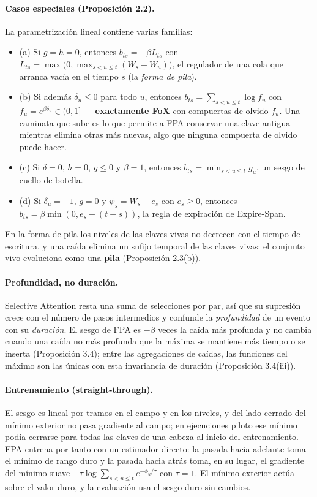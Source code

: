 \paragraph{Casos especiales (Proposición 2.2).} La parametrización lineal contiene varias familias:
\begin{itemize}[leftmargin=*]
    \item (a) Si $g=h=0$, entonces $b_{ts}=-\beta L_{ts}$ con $L_{ts}=\max\bigl(0,\max_{s<u\le t}(W_s-W_u)\bigr)$, el regulador de una cola que arranca vacía en el tiempo $s$ (la \emph{forma de pila}).
    \item (b) Si además $\delta_u\le 0$ para todo $u$, entonces $b_{ts}=\sum_{s<u\le t}\log f_u$ con $f_u=e^{\beta\delta_u}\in(0,1]$ --- \textbf{exactamente FoX} con compuertas de olvido $f_u$. Una caminata que sube es lo que permite a FPA conservar una clave antigua mientras elimina otras más nuevas, algo que ninguna compuerta de olvido puede hacer.
    \item (c) Si $\delta=0$, $h=0$, $g\le 0$ y $\beta=1$, entonces $b_{ts}=\min_{s<u\le t}g_u$, un sesgo de cuello de botella.
    \item (d) Si $\delta_u=-1$, $g=0$ y $\psi_s=W_s-e_s$ con $e_s\ge 0$, entonces $b_{ts}=\beta\min(0,e_s-(t-s))$, la regla de expiración de Expire-Span.
\end{itemize}
En la forma de pila los niveles de las claves vivas no decrecen con el tiempo de escritura, y una caída elimina un sufijo temporal de las claves vivas: el conjunto vivo evoluciona como una \textbf{pila} (Proposición 2.3(b)).

\paragraph{Profundidad, no duración.} Selective Attention resta una suma de selecciones por par, así que su supresión crece con el número de pasos intermedios y confunde la \emph{profundidad} de un evento con su \emph{duración}. El sesgo de FPA es $-\beta$ veces la caída más profunda y no cambia cuando una caída no más profunda que la máxima se mantiene más tiempo o se inserta (Proposición 3.4); entre las agregaciones de caídas, las funciones del máximo son las únicas con esta invariancia de duración (Proposición 3.4(iii)).

\paragraph{Entrenamiento (straight-through).} El sesgo es lineal por tramos en el campo y en los niveles, y del lado cerrado del mínimo exterior no pasa gradiente al campo; en ejecuciones piloto ese mínimo podía cerrarse para todas las claves de una cabeza al inicio del entrenamiento. FPA entrena por tanto con un estimador directo: la pasada hacia adelante toma el mínimo de rango duro y la pasada hacia atrás toma, en su lugar, el gradiente del mínimo suave $-\tau\log\sum_{s<u\le t}e^{-\phi_u/\tau}$ con $\tau=1$. El mínimo exterior actúa sobre el valor duro, y la evaluación usa el sesgo duro sin cambios.

